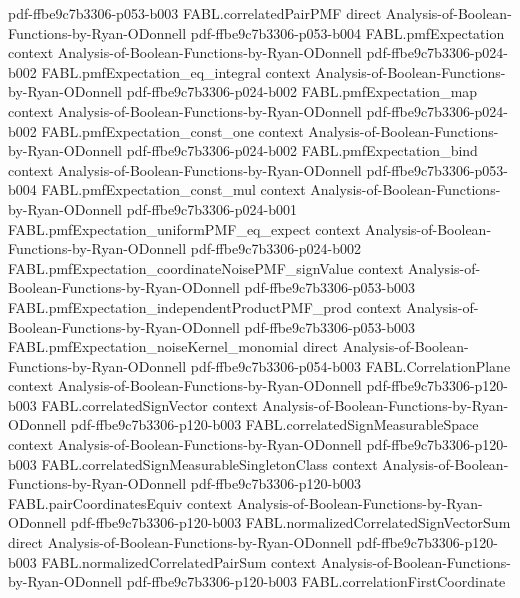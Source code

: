 \begin{theorem}
  {pdf-ffbe9c7b3306-p053-b003}
\proofstep
  {FABL.correlatedPairPMF}
  {direct}
  {Analysis-of-Boolean-Functions-by-Ryan-ODonnell}
  {pdf-ffbe9c7b3306-p053-b004}
\proofstep
  {FABL.pmfExpectation}
  {context}
  {Analysis-of-Boolean-Functions-by-Ryan-ODonnell}
  {pdf-ffbe9c7b3306-p024-b002}
\proofstep
  {FABL.pmfExpectation_eq_integral}
  {context}
  {Analysis-of-Boolean-Functions-by-Ryan-ODonnell}
  {pdf-ffbe9c7b3306-p024-b002}
\proofstep
  {FABL.pmfExpectation_map}
  {context}
  {Analysis-of-Boolean-Functions-by-Ryan-ODonnell}
  {pdf-ffbe9c7b3306-p024-b002}
\proofstep
  {FABL.pmfExpectation_const_one}
  {context}
  {Analysis-of-Boolean-Functions-by-Ryan-ODonnell}
  {pdf-ffbe9c7b3306-p024-b002}
\proofstep
  {FABL.pmfExpectation_bind}
  {context}
  {Analysis-of-Boolean-Functions-by-Ryan-ODonnell}
  {pdf-ffbe9c7b3306-p053-b004}
\proofstep
  {FABL.pmfExpectation_const_mul}
  {context}
  {Analysis-of-Boolean-Functions-by-Ryan-ODonnell}
  {pdf-ffbe9c7b3306-p024-b001}
\proofstep
  {FABL.pmfExpectation_uniformPMF_eq_expect}
  {context}
  {Analysis-of-Boolean-Functions-by-Ryan-ODonnell}
  {pdf-ffbe9c7b3306-p024-b002}
\proofstep
  {FABL.pmfExpectation_coordinateNoisePMF_signValue}
  {context}
  {Analysis-of-Boolean-Functions-by-Ryan-ODonnell}
  {pdf-ffbe9c7b3306-p053-b003}
\proofstep
  {FABL.pmfExpectation_independentProductPMF_prod}
  {context}
  {Analysis-of-Boolean-Functions-by-Ryan-ODonnell}
  {pdf-ffbe9c7b3306-p053-b003}
\proofstep
  {FABL.pmfExpectation_noiseKernel_monomial}
  {direct}
  {Analysis-of-Boolean-Functions-by-Ryan-ODonnell}
  {pdf-ffbe9c7b3306-p054-b003}
\proofstep
  {FABL.CorrelationPlane}
  {context}
  {Analysis-of-Boolean-Functions-by-Ryan-ODonnell}
  {pdf-ffbe9c7b3306-p120-b003}
\proofstep
  {FABL.correlatedSignVector}
  {context}
  {Analysis-of-Boolean-Functions-by-Ryan-ODonnell}
  {pdf-ffbe9c7b3306-p120-b003}
\proofstep
  {FABL.correlatedSignMeasurableSpace}
  {context}
  {Analysis-of-Boolean-Functions-by-Ryan-ODonnell}
  {pdf-ffbe9c7b3306-p120-b003}
\proofstep
  {FABL.correlatedSignMeasurableSingletonClass}
  {context}
  {Analysis-of-Boolean-Functions-by-Ryan-ODonnell}
  {pdf-ffbe9c7b3306-p120-b003}
\proofstep
  {FABL.pairCoordinatesEquiv}
  {context}
  {Analysis-of-Boolean-Functions-by-Ryan-ODonnell}
  {pdf-ffbe9c7b3306-p120-b003}
\proofstep
  {FABL.normalizedCorrelatedSignVectorSum}
  {direct}
  {Analysis-of-Boolean-Functions-by-Ryan-ODonnell}
  {pdf-ffbe9c7b3306-p120-b003}
\proofstep
  {FABL.normalizedCorrelatedPairSum}
  {context}
  {Analysis-of-Boolean-Functions-by-Ryan-ODonnell}
  {pdf-ffbe9c7b3306-p120-b003}
\proofstep
  {FABL.correlationFirstCoordinate}

\end{theorem}
